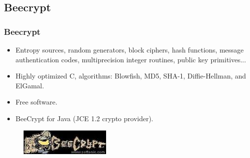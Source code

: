 \documentclass{beamer}
\begin{document}
\subsection{Beecrypt}
\begin{frame}
\frametitle{Beecrypt}
\begin{itemize}
\item Entropy sources, random generators, block ciphers, hash functions, message authentication codes, multiprecision integer routines, public key primitives...
\item Highly optimized C, algorithms: Blowfish, MD5, SHA-1, Diffie-Hellman, and ElGamal.
\item Free software.
\item BeeCrypt for Java (JCE 1.2 crypto provider).
\end{itemize}
\begin{figure}
\includegraphics[width=0.3\linewidth]{beecrypt.jpg}
\end{figure}
\end{frame}

\end{document}
